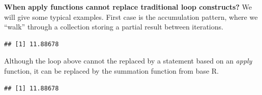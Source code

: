 \documentclass[krantz2,ChapterTOCs]{krantz}\usepackage{knitr}
\begin{document}
\begin{explainbox}
\textbf{When apply functions cannot replace traditional loop constructs?} We will give some typical examples. First case is the accumulation pattern, where we ``walk'' through a collection storing a partial result between iterations.
\begin{knitrout}\footnotesize
{}\color{fgcolor}\begin{kframe}
\begin{alltt}
\hlstd{(}\hlstd{)}
 \hlkwb{<-} \hlstd{(}\hlstd{)}
 \hlkwb{<-} 
   \hlstd{(} 
   \hlkwb{<-}  \hlopt{+} 
  \hlstd{\}}
\end{alltt}
\begin{verbatim}
## [1] 11.88678
\end{verbatim}
\end{kframe}
\end{knitrout}

Although the loop above cannot the replaced by a statement based on an \emph{apply} function, it can be replaced by the summation function  from base R.
\begin{knitrout}\footnotesize
{}\color{fgcolor}\begin{kframe}
\begin{alltt}
\hlstd{(}\hlstd{)}
 \hlkwb{<-} \hlstd{(}\hlstd{)}
 \hlkwb{<-} 
\end{alltt}
\begin{verbatim}
## [1] 11.88678
\end{verbatim}
\end{kframe}
\end{knitrout}


\end{explainbox}
\end{document}
